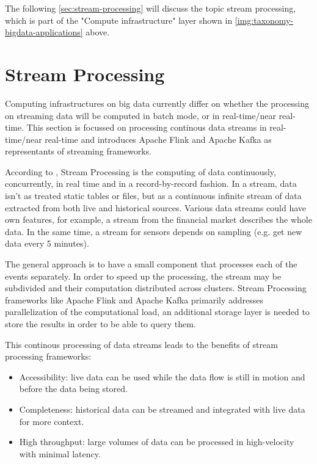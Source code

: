 The following \autoref{sec:stream-processing} will discuss the topic stream processing, which is part of the
"Compute infrastructure" layer shown in \autoref{img:taxonomy-bigdata-applications} above.

\section{Stream Processing}
\label{sec:stream-processing}
Computing infrastructures on big data currently differ on whether the processing on streaming data
will be computed in batch mode, or in real-time/near real-time. This section is focussed on processing
continous data streams in real-time/near real-time and introduces Apache Flink and Apache Kafka as
representants of streaming frameworks.

According to \cite{Klepp16}, Stream Processing is the computing of data continuously,
concurrently, in real time and in a record-by-record fashion. In a stream, data isn't as treated static tables
or files, but as a continuous infinite stream of data extracted from both live and historical
sources. Various data streams could have own features, for example, a stream
from the financial market describes the whole data. In the same time, a stream for sensors
depends on sampling (e.g. get new data every 5 minutes).

The general approach is to have a small component that processes each of the events
separately. In order to speed up the processing, the stream may be subdivided and
their computation distributed across clusters. Stream Processing frameworks like Apache Flink and
Apache Kafka primarily addresses parallelization of the computational load, an additional storage
layer is needed to store the results in order to be able to query them.

This continous processing of data streams leads to the benefits of stream processing frameworks:

\begin{itemize}
	\item Accessibility: live data can be used while the data flow is still in motion and before the data being stored.
	\item Completeness: historical data can be streamed and integrated with live data for more context.
	\item High throughput: large volumes of data can be processed in high-velocity with minimal latency.
\end{itemize}

